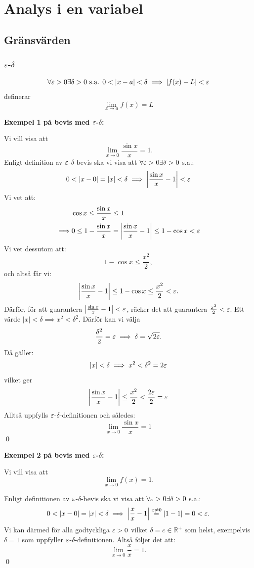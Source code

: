 \section{Analys i en variabel}

\subsection{Gränsvärden}

\subsubsection{\texorpdfstring{$\varepsilon$-$\delta$}{Epsilon-Delta}}
$$
	\forall\varepsilon>0\exists\delta>0\text{ s.a. }0<\qty|x-a|<\delta\implies\qty|f(x)-L|<\varepsilon
$$
definerar
$$
	\lim_{x\to a}f(x)=L
$$

\begin{ber}
	\textbf{Exempel 1 på bevis med $\varepsilon$-$\delta$:}

	Vi vill visa att
	$$
		\lim_{x\to0}\frac{\sin x}{x}=1.
	$$
	Enligt definition av $\varepsilon$-$\delta$-bevis ska vi visa att $\forall\varepsilon>0\exists\delta>0$ s.a.:
	$$
		0<\qty|x-0|=\qty|x|<\delta\implies\qty|\frac{\sin x}{x}-1|<\varepsilon
	$$
	Vi vet att:
	\begin{align*}
		&\cos x\leq\frac{\sin x}{x}\leq 1\\
		\implies&0\leq1-\frac{\sin x}{x}=\qty|\frac{\sin x}{x}-1|\leq1-\cos x<\varepsilon
	\end{align*}
	Vi vet dessutom att:
	$$
		1-\cos x\leq\frac{x^2}{2},
	$$
	och altså får vi:
	$$
		\qty|\frac{\sin x}{x}-1|\leq1-\cos x\leq\frac{x^2}{2}<\varepsilon.
	$$
	Därför, för att guarantera $\qty|\frac{\sin x}{x}-1|<\varepsilon$, räcker det att
	guarantera $\frac{x^2}{2}<\varepsilon$. Ett värde $|x|<\delta\implies x^2<\delta^2$.
	Därför kan vi välja
	$$
		\frac{\delta^2}{2}=\varepsilon\implies\delta=\sqrt{2\varepsilon}.
	$$
	Då gäller:
	$$
		|x|<\delta\implies x^2<\delta^2=2\varepsilon
	$$
	vilket ger
	$$
		\qty|\frac{\sin x}{x}-1|\leq\frac{x^2}{2}<\frac{2\varepsilon}{2}=\varepsilon
	$$
	Alltså uppfylls $\varepsilon$-$\delta$-definitionen och således:
	$$
		\lim_{x\to0}\frac{\sin x}{x}=1
	$$\qed
\end{ber}

\begin{ber}
	\textbf{Exempel 2 på bevis med $\varepsilon$-$\delta$:}

	Vi vill visa att
	$$
		\lim_{x\to0}f(x)=1.
	$$

	Enligt definitionen av $\varepsilon$-$\delta$-bevis ska vi visa att $\forall\varepsilon>0\exists\delta>0$ s.a.:
	$$
		0<\qty|x-0|=\qty|x|<\delta\implies\qty|\frac{x}{x}-1|\stackrel{x\neq0}{=}\qty|1-1|=0<\varepsilon.
	$$
	Vi kan därmed för alla godtyckliga $\varepsilon>0$ vilket $\delta=c\in\mathbb{R}^+$ som helst,
	exempelvis $\delta=1$ som uppfyller $\varepsilon$-$\delta$-definitionen. Altså
	följer det att:
	$$
		\lim_{x\to0}\frac{x}{x}=1.
	$$\qed
\end{ber}

